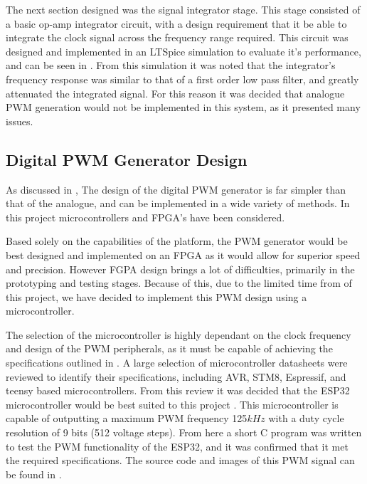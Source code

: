 The next section designed was the signal integrator stage. This stage consisted of a basic op-amp integrator circuit, with a design requirement that it be able to integrate the clock signal across the frequency range required. This circuit was designed and implemented in an LTSpice simulation to evaluate it's performance, and can be seen in . From this simulation it was noted that the integrator's frequency response was similar to that of a first order low pass filter, and greatly attenuated the integrated signal. For this reason it was decided that analogue PWM generation would not be implemented in this system, as it presented many issues.

\subsection{Digital PWM Generator Design}\label{S:digital_design}

As discussed in , The design of the digital PWM generator is far simpler than that of the analogue, and can be implemented in a wide variety of methods. In this project microcontrollers and FPGA's have been considered.

Based solely on the capabilities of the platform, the PWM generator would be best designed and implemented on an FPGA as it would allow for superior speed and precision. However FGPA design brings a lot of difficulties, primarily in the prototyping and testing stages. Because of this, due to the limited time from of this project, we have decided to implement this PWM design using a microcontroller.

The selection of the microcontroller is highly dependant on the clock frequency and design of the PWM peripherals, as it must be capable of achieving the specifications outlined in . A large selection of microcontroller datasheets were reviewed to identify their specifications, including AVR, STM8, Espressif, and teensy based microcontrollers. From this review it was decided that the ESP32 microcontroller would be best suited to this project \cite{ESP32Manual}. This microcontroller is capable of outputting a maximum PWM frequency 125$kHz$ with a duty cycle resolution of 9 bits (512 voltage steps). From here a short C program was written to test the PWM functionality of the ESP32, and it was confirmed that it met the required specifications. The source code and images of this PWM signal can be found in .